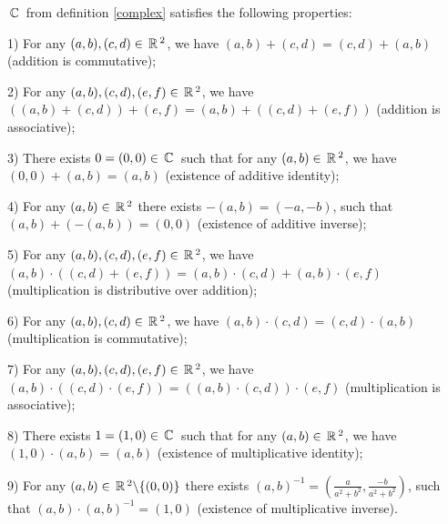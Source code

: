\begin{theorem}\label{complex_properties}
$\,\mathbb{C}\,$ from definition \ref{complex} satisfies the following properties:

1) For any $(a, b),(c, d) \in \,\mathbb{R}\,^2$, we have $(a, b)+(c, d) = (c, d)+(a, b)$ (addition is commutative);

2) For any $(a, b),(c, d),(e, f) \in \,\mathbb{R}\,^2$, we have $((a, b)+(c, d))+(e, f) = (a, b)+((c, d)+(e, f))$ (addition is associative);

3) There exists $0=(0,0)\in\,\mathbb{C}\,$ such that for any $(a, b) \in \,\mathbb{R}\,^2$, we have $(0,0)+(a, b) = (a, b)$ (existence of additive identity);

4) For any $(a, b) \in \,\mathbb{R}\,^2$ there exists $-(a, b) = (-a,-b)$, such that $(a, b)+(-(a, b)) = (0,0)$ (existence of additive inverse);

5) For any $(a, b),(c, d),(e, f) \in \,\mathbb{R}\,^2$, we have $(a, b) \cdot((c, d)+(e, f)) = (a, b) \cdot(c, d)+(a, b) \cdot(e, f)$ (multiplication is distributive over addition);

6) For any $(a, b),(c, d) \in \,\mathbb{R}\,^2$, we have $(a, b) \cdot(c, d) = (c, d) \cdot(a, b)$ (multiplication is commutative);

7) For any $(a, b),(c, d),(e, f) \in \,\mathbb{R}\,^2$, we have $(a, b) \cdot((c, d) \cdot(e, f)) = ((a, b) \cdot(c, d)) \cdot(e, f)$ (multiplication is associative);

8) There exists $1=(1,0)\in\,\mathbb{C}\,$ such that for any $(a, b) \in \,\mathbb{R}\,^2$, we have $(1,0) \cdot(a, b) = (a, b)$ (existence of multiplicative identity);

9) For any $(a, b) \in \,\mathbb{R}\,^2 \backslash\{(0,0)\}$ there exists $(a, b)^{-1} = \left(\frac{a}{a^2+b^2}, \frac{-b}{a^2+b^2}\right)$, such that $(a, b) \cdot(a, b)^{-1} = (1,0)$ (existence of multiplicative inverse).
\end{theorem}

